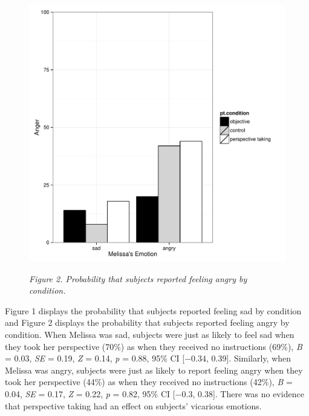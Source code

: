 \documentclass[man,a4paper,noextraspace,apacite]{apa6}\usepackage[]{graphicx}\usepackage[]{color}
\makeatletter
\def\maxwidth{ %
  \ifdim\Gin@nat@width>\linewidth
    \linewidth
  \else
    \Gin@nat@width
  \fi
}
\newenvironment{knitrout}{}{} %
\makeatother
\begin{document}
\begin{figure}
\begin{knitrout}
\color{fgcolor}
\includegraphics[width=\maxwidth]{figure/Figure2Angry-1} 

\end{knitrout}
\textit{Figure 2. Probability that subjects reported feeling angry by condition.}
\end{figure}



Figure 1 displays the probability that subjects reported feeling sad by condition and Figure 2 displays the probability that subjects reported feeling angry by condition. When Melissa was sad, subjects were just as likely to feel sad when they took her perspective (70\%) as when they received no instructions (69\%), \textit{B} = 0.03, \textit{SE} = 0.19, \textit{Z} = 0.14, \textit{p} = 0.88, 95\% CI [\ensuremath{-0.34}, 0.39]. Similarly, when Melissa was angry, subjects were just as likely to report feeling angry when they took her perspective (44\%) as when they received no instructions (42\%), \textit{B} = 0.04, \textit{SE} = 0.17, \textit{Z} = 0.22, \textit{p} = 0.82, 95\% CI [\ensuremath{-0.3}, 0.38]. There was no evidence that perspective taking had an effect on subjects' vicarious emotions.
\end{document}
